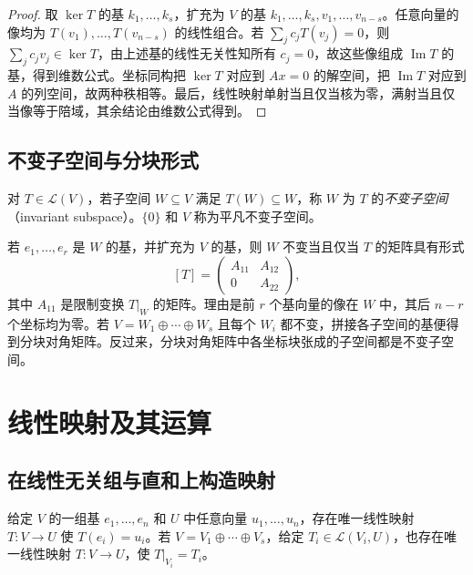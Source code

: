 \begin{proof}
取 $\ker T$ 的基 $k_1,\ldots,k_s$，扩充为 $V$ 的基 $k_1,\ldots,k_s,v_1,\ldots,v_{n-s}$。任意向量的像均为 $T(v_1),\ldots,T(v_{n-s})$ 的线性组合。若 $\sum_j c_jT(v_j)=0$，则 $\sum_jc_jv_j\in\ker T$，由上述基的线性无关性知所有 $c_j=0$，故这些像组成 $\operatorname{Im}T$ 的基，得到维数公式。坐标同构把 $\ker T$ 对应到 $Ax=0$ 的解空间，把 $\operatorname{Im}T$ 对应到 $A$ 的列空间，故两种秩相等。最后，线性映射单射当且仅当核为零，满射当且仅当像等于陪域，其余结论由维数公式得到。
\end{proof}

\subsection{不变子空间与分块形式}

\begin{definition}
\label{def:xie-ex-invariant-subspace}
对 $T\in\mathcal L(V)$，若子空间 $W\subseteq V$ 满足 $T(W)\subseteq W$，称 $W$ 为 $T$ 的\emph{不变子空间}（invariant subspace）。$\{0\}$ 和 $V$ 称为平凡不变子空间。
\end{definition}

若 $e_1,\ldots,e_r$ 是 $W$ 的基，并扩充为 $V$ 的基，则 $W$ 不变当且仅当 $T$ 的矩阵具有形式
\begin{equation}
\label{eq:xie-ex-invariant-block}
    [T]=\begin{pmatrix}A_{11}&A_{12}\\0&A_{22}\end{pmatrix},
\end{equation}
其中 $A_{11}$ 是限制变换 $T|_W$ 的矩阵。理由是前 $r$ 个基向量的像在 $W$ 中，其后 $n-r$ 个坐标均为零。若 $V=W_1\oplus\cdots\oplus W_s$ 且每个 $W_i$ 都不变，拼接各子空间的基便得到分块对角矩阵。反过来，分块对角矩阵中各坐标块张成的子空间都是不变子空间。

\section{线性映射及其运算}
\label{sec:xie-ex-linear-construction}

\subsection{在线性无关组与直和上构造映射}

\begin{theorem}
\label{thm:xie-ex-linear-extension}
给定 $V$ 的一组基 $e_1,\ldots,e_n$ 和 $U$ 中任意向量 $u_1,\ldots,u_n$，存在唯一线性映射 $T:V\to U$ 使 $T(e_i)=u_i$。若 $V=V_1\oplus\cdots\oplus V_s$，给定 $T_i\in\mathcal L(V_i,U)$，也存在唯一线性映射 $T:V\to U$，使 $T|_{V_i}=T_i$。
\end{theorem}

